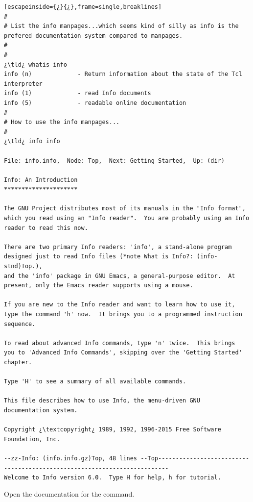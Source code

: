 \begin{lstlisting}[escapeinside={¿}{¿},frame=single,breaklines]
#
# List the info manpages...which seems kind of silly as info is the prefered documentation system compared to manpages.
#
#
¿\tld¿ whatis info
info (n)             - Return information about the state of the Tcl interpreter
info (1)             - read Info documents
info (5)             - readable online documentation
#
# How to use the info manpages...
#
¿\tld¿ info info

File: info.info,  Node: Top,  Next: Getting Started,  Up: (dir)

Info: An Introduction
*********************

The GNU Project distributes most of its manuals in the "Info format",
which you read using an "Info reader".  You are probably using an Info
reader to read this now.

There are two primary Info readers: 'info', a stand-alone program
designed just to read Info files (*note What is Info?: (info-stnd)Top.),
and the 'info' package in GNU Emacs, a general-purpose editor.  At
present, only the Emacs reader supports using a mouse.

If you are new to the Info reader and want to learn how to use it,
type the command 'h' now.  It brings you to a programmed instruction
sequence.

To read about advanced Info commands, type 'n' twice.  This brings
you to 'Advanced Info Commands', skipping over the 'Getting Started'
chapter.

Type 'H' to see a summary of all available commands.

This file describes how to use Info, the menu-driven GNU
documentation system.

Copyright ¿\textcopyright¿ 1989, 1992, 1996-2015 Free Software Foundation, Inc.

--zz-Info: (info.info.gz)Top, 48 lines --Top-------------------------------------------------------------------------
Welcome to Info version 6.0.  Type H for help, h for tutorial.

\end{lstlisting}

Open the  documentation for the  command.

